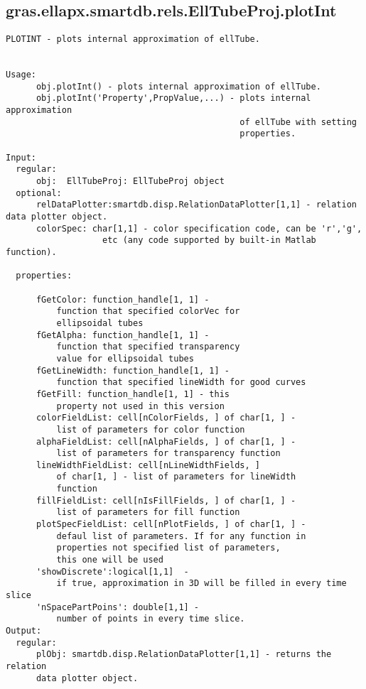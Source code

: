 \subsection{\texorpdfstring{gras.ellapx.smartdb.rels.EllTubeProj.plotInt}{plotInt}}\label{method:gras.ellapx.smartdb.rels.EllTubeProj.plotInt}
\begin{verbatim}
PLOTINT - plots internal approximation of ellTube.


Usage:
      obj.plotInt() - plots internal approximation of ellTube.
      obj.plotInt('Property',PropValue,...) - plots internal approximation
                                              of ellTube with setting
                                              properties.

Input:
  regular:
      obj:  EllTubeProj: EllTubeProj object
  optional:
      relDataPlotter:smartdb.disp.RelationDataPlotter[1,1] - relation data plotter object.
      colorSpec: char[1,1] - color specification code, can be 'r','g',
                   etc (any code supported by built-in Matlab function).

  properties:

      fGetColor: function_handle[1, 1] -
          function that specified colorVec for
          ellipsoidal tubes
      fGetAlpha: function_handle[1, 1] -
          function that specified transparency
          value for ellipsoidal tubes
      fGetLineWidth: function_handle[1, 1] -
          function that specified lineWidth for good curves
      fGetFill: function_handle[1, 1] - this
          property not used in this version
      colorFieldList: cell[nColorFields, ] of char[1, ] -
          list of parameters for color function
      alphaFieldList: cell[nAlphaFields, ] of char[1, ] -
          list of parameters for transparency function
      lineWidthFieldList: cell[nLineWidthFields, ]
          of char[1, ] - list of parameters for lineWidth
          function
      fillFieldList: cell[nIsFillFields, ] of char[1, ] -
          list of parameters for fill function
      plotSpecFieldList: cell[nPlotFields, ] of char[1, ] -
          defaul list of parameters. If for any function in
          properties not specified list of parameters,
          this one will be used
      'showDiscrete':logical[1,1]  -
          if true, approximation in 3D will be filled in every time slice
      'nSpacePartPoins': double[1,1] -
          number of points in every time slice.
Output:
  regular:
      plObj: smartdb.disp.RelationDataPlotter[1,1] - returns the relation
      data plotter object.
\end{verbatim}
